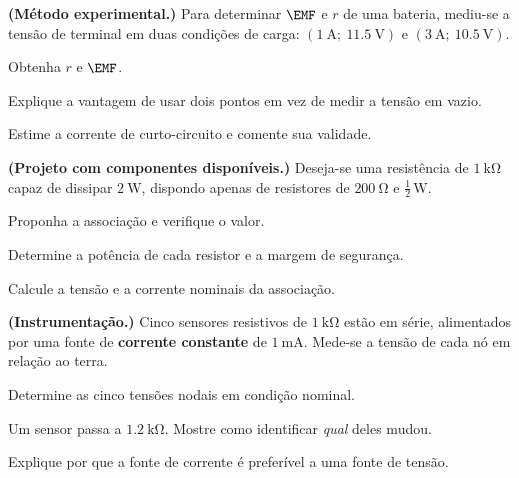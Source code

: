 \begin{questao}[4]{}

\textbf{(Método experimental.)} Para determinar $\EMF$ e $r$ de uma bateria,
mediu-se a tensão de terminal em duas condições de carga:
$(\SI{1}{\ampere};\ \SI{11.5}{\volt})$ e
$(\SI{3}{\ampere};\ \SI{10.5}{\volt})$.
\begin{itensq}
\item Obtenha $r$ e $\EMF$.
\item Explique a vantagem de usar dois pontos em vez de medir a tensão em
      vazio.
\item Estime a corrente de curto-circuito e comente sua validade.
\end{itensq}


\end{questao}
\begin{questao}[4]{}

\textbf{(Projeto com componentes disponíveis.)} Deseja-se uma resistência de
$\SI{1}{\kilo\ohm}$ capaz de dissipar $\SI{2}{\watt}$, dispondo apenas de
resistores de $\SI{200}{\ohm}$ e $\frac{1}{2}\,\si{\watt}$.
\begin{itensq}
\item Proponha a associação e verifique o valor.
\item Determine a potência de cada resistor e a margem de segurança.
\item Calcule a tensão e a corrente nominais da associação.
\end{itensq}


\end{questao}
\begin{questao}[4]{}

\textbf{(Instrumentação.)} Cinco sensores resistivos de $\SI{1}{\kilo\ohm}$
estão em série, alimentados por uma fonte de \textbf{corrente constante} de
$\SI{1}{\milli\ampere}$. Mede-se a tensão de cada nó em relação ao terra.
\begin{itensq}
\item Determine as cinco tensões nodais em condição nominal.
\item Um sensor passa a $\SI{1.2}{\kilo\ohm}$. Mostre como identificar
      \emph{qual} deles mudou.
\item Explique por que a fonte de corrente é preferível a uma fonte de tensão.
\end{itensq}


\end{questao}

